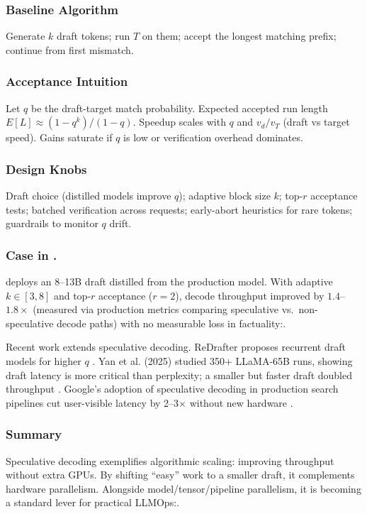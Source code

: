 \subsubsection{Baseline Algorithm} Generate $k$ draft tokens; run $T$ on them; accept the longest matching prefix; continue from first mismatch.

\subsubsection{Acceptance Intuition} Let $q$ be the draft-target match probability. Expected accepted run length $E[L]\approx (1-q^k)/(1-q)$. Speedup scales with $q$ and $v_d/v_T$ (draft vs target speed). Gains saturate if $q$ is low or verification overhead dominates.

\subsubsection{Design Knobs} Draft choice (distilled models improve $q$); adaptive block size $k$; top-$r$ acceptance tests; batched verification across requests; early-abort heuristics for rare tokens; guardrails to monitor $q$ drift.

\subsubsection{Case in \ishtar{}.} \ishtar{} deploys an 8--13B draft distilled from the production model. With adaptive $k\in[3,8]$ and top-$r$ acceptance ($r=2$), decode throughput improved by $1.4$--$1.8\times$ (measured via production metrics comparing speculative vs.\ non-speculative decode paths) with no measurable loss in factuality:\cite{vllm_pagedattention,tensorrt_llm_docs,tgi_docs}.

Recent work extends speculative decoding. ReDrafter proposes recurrent draft models for higher $q$ \cite{reda2023redrafter}. Yan et al. (2025) studied 350+ LLaMA-65B runs, showing draft latency is more critical than perplexity; a smaller but faster draft doubled throughput \cite{pope2023exegpt}. Google’s adoption of speculative decoding in production search pipelines cut user-visible latency by 2--3$\times$ without new hardware \cite{google2022_chip}.

\subsubsection{Summary} Speculative decoding exemplifies algorithmic scaling: improving throughput without extra GPUs. By shifting ``easy'' work to a smaller draft, it complements hardware parallelism. Alongside model/tensor/pipeline parallelism, it is becoming a standard lever for practical LLMOps:\cite{speculative_decoding}.

